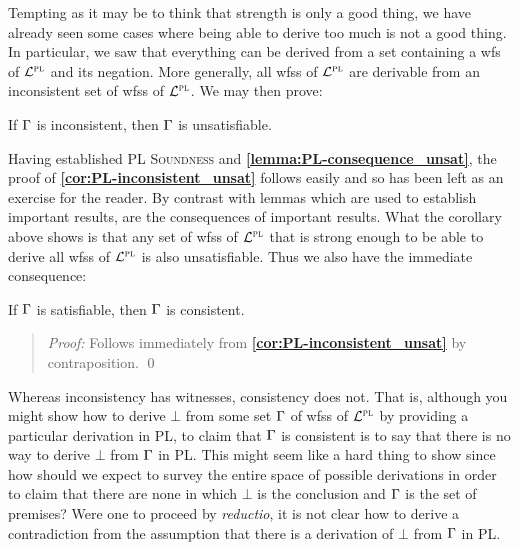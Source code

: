 Tempting as it may be to think that strength is only a good thing, we have already seen some cases where being able to derive too much is not a good thing.
In particular, we saw that everything can be derived from a set containing a wfs of $\mathcal{L}^{\textsc{pl}}$ and its negation.
More generally, all wfss of $\mathcal{L}^{\textsc{pl}}$ are derivable from an inconsistent set of wfss of $\mathcal{L}^{\textsc{pl}}$.
We may then prove:

\begin{Cthm} \label{cor:PL-inconsistent_unsat}
  If $\Gamma$ is inconsistent, then $\Gamma$ is unsatisfiable. 
\end{Cthm}
 \vspace{-.2in}

Having established \textsc{PL Soundness} and \textbf{\ref{lemma:PL-consequence_unsat}}, the proof of \textbf{\ref{cor:PL-inconsistent_unsat}} follows easily and so has been left as an exercise for the reader.
By contrast with lemmas which are used to establish important results,  are the consequences of important results.
What the corollary above shows is that any set of wfss of $\mathcal{L}^{\textsc{pl}}$ that is strong enough to be able to derive all wfss of $\mathcal{L}^{\textsc{pl}}$ is also unsatisfiable. 
Thus we also have the immediate consequence:

\begin{Cthm} \label{cor:PL-sat_consistent}
  If $\Gamma$ is satisfiable, then $\Gamma$ is consistent.
\end{Cthm}
 \vspace{-.2in}

\begin{quote} 
  \textit{Proof:}
  Follows immediately from \textbf{\ref{cor:PL-inconsistent_unsat}} by contraposition.
  \qed
\end{quote}

Whereas inconsistency has witnesses, consistency does not.
That is, although you might show how to derive $\bot$ from some set $\Gamma$ of wfss of $\mathcal{L}^{\textsc{pl}}$ by providing a particular derivation in PL, to claim that $\Gamma$ is consistent is to say that there is no way to derive $\bot$ from $\Gamma$ in PL. 
This might seem like a hard thing to show since how should we expect to survey the entire space of possible derivations in order to claim that there are none in which $\bot$ is the conclusion and $\Gamma$ is the set of premises?
Were one to proceed by \textit{reductio}, it is not clear how to derive a contradiction from the assumption that there is a derivation of $\bot$ from $\Gamma$ in PL. 

